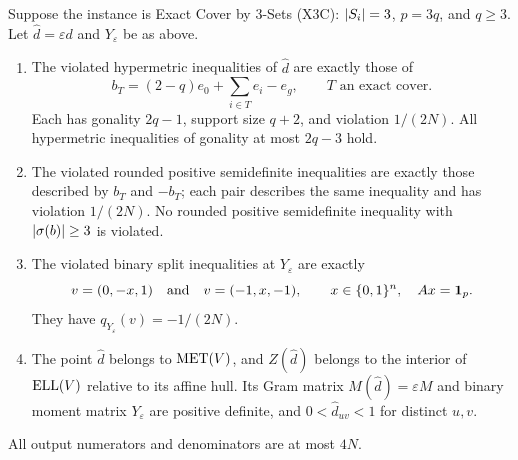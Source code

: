 \begin{theorem}
\label{thm:relaxation-hardness}
Suppose the instance is Exact Cover by 3-Sets (X3C):
$\left\lvert S_i\right\rvert=3$, $p=3q$, and $q\geq3$.  Let
$\widehat d=\varepsilon d$ and $Y_\varepsilon$ be as above.
\begin{enumerate}
  \item The violated hypermetric inequalities of $\widehat d$ are exactly
  those of
  \[
    b_T=(2-q)e_0+\sum_{i\in T}e_i-e_g,
    \qquad T\text{ an exact cover}.
  \]
  Each has gonality $2q-1$, support size $q+2$, and violation $1/(2N)$.
  All hypermetric inequalities of gonality at most $2q-3$ hold.

  \item The violated rounded positive semidefinite inequalities are exactly
  those described by $b_T$ and $-b_T$; each pair describes the same inequality and has
  violation $1/(2N)$.  No rounded positive semidefinite inequality with
  $\left\lvert \sigma(b)\right\rvert\geq3$ is violated.

  \item The violated binary split inequalities at $Y_\varepsilon$ are
  exactly
  \[
    v=(0,-x,1)\quad\text{and}\quad v=(-1,x,-1),
    \qquad x\in\{0,1\}^n,\quad Ax=\mathbf 1_p.
  \]
  They have $q_{Y_\varepsilon}(v)=-1/(2N)$.

  \item The point $\widehat d$ belongs to $\operatorname{MET}(V)$, and
  $Z(\widehat d)$ belongs to the interior of $\operatorname{ELL}(V)$ relative to its
  affine hull.  Its Gram matrix
  $M(\widehat d)=\varepsilon M$ and binary moment matrix
  $Y_\varepsilon$ are positive definite, and
  $0<\widehat d_{uv}<1$ for distinct $u,v$.
\end{enumerate}
All output numerators and denominators are at most $4N$.
\end{theorem}

